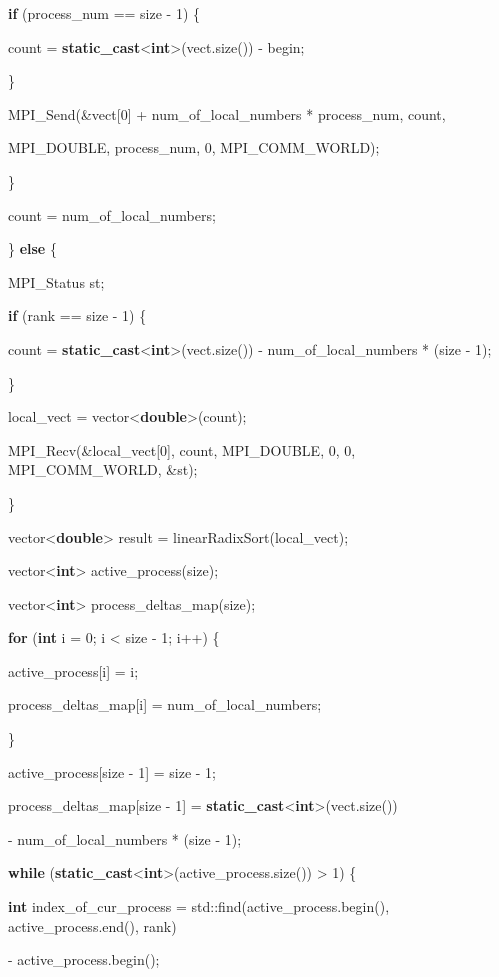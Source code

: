 \documentclass[]{article}
\begin{document}
\textbf{if} (process\_num == size - 1) \{

count =
\textbf{static\_cast}\textless{}\textbf{int}\textgreater{}(vect.size())
- begin;

\}

MPI\_Send(\&vect{[}0{]} + num\_of\_local\_numbers * process\_num, count,

MPI\_DOUBLE, process\_num, 0, MPI\_COMM\_WORLD);

\}

count = num\_of\_local\_numbers;

\} \textbf{else} \{

MPI\_Status st;

\textbf{if} (rank == size - 1) \{

count =
\textbf{static\_cast}\textless{}\textbf{int}\textgreater{}(vect.size())
- num\_of\_local\_numbers * (size - 1);

\}

local\_vect = vector\textless{}\textbf{double}\textgreater{}(count);

MPI\_Recv(\&local\_vect{[}0{]}, count, MPI\_DOUBLE, 0, 0,
MPI\_COMM\_WORLD, \&st);

\}

vector\textless{}\textbf{double}\textgreater{} result =
linearRadixSort(local\_vect);

vector\textless{}\textbf{int}\textgreater{} active\_process(size);

vector\textless{}\textbf{int}\textgreater{} process\_deltas\_map(size);

\textbf{for} (\textbf{int} i = 0; i \textless{} size - 1; i++) \{

active\_process{[}i{]} = i;

process\_deltas\_map{[}i{]} = num\_of\_local\_numbers;

\}

active\_process{[}size - 1{]} = size - 1;

process\_deltas\_map{[}size - 1{]} =
\textbf{static\_cast}\textless{}\textbf{int}\textgreater{}(vect.size())

- num\_of\_local\_numbers * (size - 1);

\textbf{while}
(\textbf{static\_cast}\textless{}\textbf{int}\textgreater{}(active\_process.size())
\textgreater{} 1) \{

\textbf{int} index\_of\_cur\_process =
std::find(active\_process.begin(), active\_process.end(), rank)

- active\_process.begin();
\end{document}
